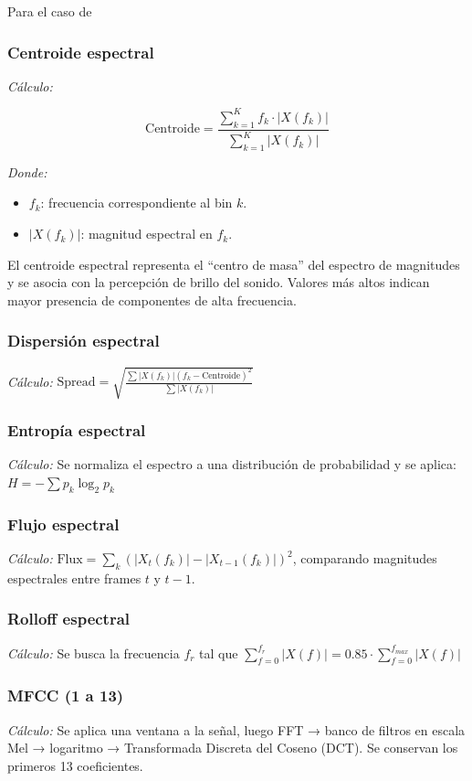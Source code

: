 Para el caso de



\subsubsection{Centroide espectral}

\textit{Cálculo:}

\[
    \text{Centroide} = \frac{\sum_{k=1}^{K} f_k \cdot |X(f_k)|}{\sum_{k=1}^{K} |X(f_k)|}
\]

\textit{Donde:}

\begin{itemize}
    \item \( f_k \): frecuencia correspondiente al bin \( k \).
    \item \( |X(f_k)| \): magnitud espectral en \( f_k \).
\end{itemize}

El centroide espectral representa el “centro de masa” del espectro de magnitudes y se asocia con la percepción de brillo del sonido. Valores más altos indican mayor presencia de componentes de alta frecuencia.


\subsubsection{Dispersión espectral}
\textit{Cálculo:} $\text{Spread} = \sqrt{\frac{\sum |X(f_k)|(f_k - \text{Centroide})^2}{\sum |X(f_k)|}}$

\subsubsection{Entropía espectral}
\textit{Cálculo:} Se normaliza el espectro a una distribución de probabilidad y se aplica: $H = -\sum p_k \log_2 p_k$

\subsubsection{Flujo espectral}
\textit{Cálculo:} $\text{Flux} = \sum_k \left( |X_{t}(f_k)| - |X_{t-1}(f_k)| \right)^2$, comparando magnitudes espectrales entre frames $t$ y $t-1$.

\subsubsection{Rolloff espectral}
\textit{Cálculo:} Se busca la frecuencia $f_r$ tal que $\sum_{f=0}^{f_r} |X(f)| = 0.85 \cdot \sum_{f=0}^{f_{max}} |X(f)|$

\subsubsection{MFCC (1 a 13)}
\textit{Cálculo:} Se aplica una ventana a la señal, luego FFT → banco de filtros en escala Mel → logaritmo → Transformada Discreta del Coseno (DCT). Se conservan los primeros 13 coeficientes.